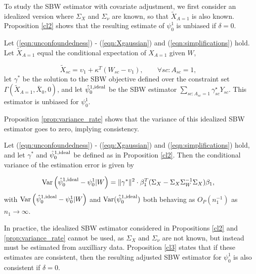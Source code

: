 To study the SBW estimator with covariate adjustment, we first consider an idealized version where $\Sigma_X$ and $\Sigma_\nu$ are known, so that $\tilde{X}_{A=1}$ is also known. Proposition \ref{cl2} shows that the resulting estimate of $\psi_0^1$ is unbiased if $\delta = 0$.

\begin{proposition}\label{cl2}
Let (\ref{eqn:unconfoundedness}) - (\ref{eqn:Xgaussian}) and (\ref{eqn:simplifications}) hold. Let $\tilde{X}_{A=1}$ equal the conditional expectation of $X_{A=1}$ given $W$,

\[ \tilde{X}_{sc} = \upsilon_1 + \kappa^T (W_{sc} - \upsilon_1), \qquad \forall sc: A_{sc} = 1,\] let $\gamma^*$ be the solution to the SBW objective defined over the constraint set $\Gamma(\tilde{X}_{A=1}, \bar{X}_0, 0)$, and let $\hat{\psi}^{1, \textup{ideal}}_0$ be the SBW estimator $\sum_{sc: A_{sc} = 1}\gamma^\star_{sc}Y_{sc}$. This estimator is unbiased for $\psi_0^1$.
\end{proposition}



Proposition \ref{prop:variance_rate} shows that the variance of this idealized SBW estimator goes to zero, implying consistency. 
\begin{proposition}\label{prop:variance_rate}
Let (\ref{eqn:unconfoundedness}) - (\ref{eqn:Xgaussian}) and (\ref{eqn:simplifications}) hold, and let $\gamma^*$ and $\hat{\psi}_0^{1, \textup{ideal}}$ be defined as in Proposition \ref{cl2}. Then the conditional variance of the estimation error is given by

\begin{align*}
\operatorname{Var}\left( \hat{\psi}_0^{1, \textup{ideal}} - \psi_0^1| W\right)  = \|\gamma^*\|^2 \cdot \beta_1^T(\Sigma_{X} - \Sigma_{X}\Sigma_{W}^{-1}\Sigma_{X})\beta_1, 
\end{align*}
with $\operatorname{Var}\left( \hat{\psi}_0^{1, \textup{ideal}} - \psi_0^1| W\right)$ and $\operatorname{Var}(\hat{\psi}_0^{1,\textup{ideal}})$ both behaving as $O_P(n_1^{-1})$ as $n_1 \rightarrow \infty$.
\end{proposition}

In practice, the idealized SBW estimator considered in Propositions \ref{cl2} and \ref{prop:variance_rate} cannot be used, as $\Sigma_X$ and $\Sigma_{\nu}$ are not known, but instead must be estimated from auxilliary data. Proposition \ref{cl3} states that if these estimates are consistent, then the resulting adjusted SBW estimator for $\psi_0^1$ is also consistent if $\delta = 0$.

